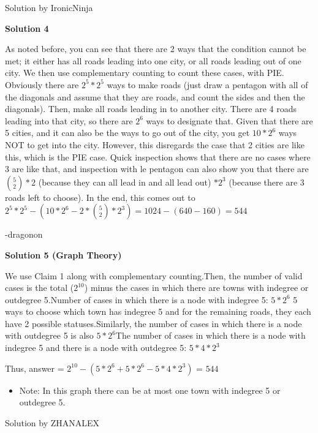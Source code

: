 \begin{enumerate}
 Solution by IronicNinja~

 



\textbf{Solution 4}

As noted before, you can see that there are 2 ways that the condition cannot be met; it either has all roads leading into one city, or all roads leading out of one city. We then use complementary counting to count these cases, with PIE. Obviously there are $2^5*2^5$ ways to make roads (just draw a pentagon with all of the diagonals and assume that they are roads, and count the sides and then the diagonals). Then, make all roads leading in to another city. There are 4 roads leading into that city, so there are $2^6$ ways to designate that. Given that there are 5 cities, and it can also be the ways to go out of the city, you get $10*2^6$ ways NOT to get into the city. However, this disregards the case that 2 cities are like this, which is the PIE case. Quick inspection shows that there are no cases where 3 are like that, and inspection with le pentagon can also show you that there are $\binom{5}{2}*2$ (because they can all lead in and all lead out) $*2^3$ (because there are 3 roads left to choose). In the end, this comes out to $2^5*2^5-(10*2^6-2*\binom{5}{2}*2^3)=1024-(640-160)=\boxed{544}$

 -dragonon

 



\textbf{Solution 5 (Graph Theory)}

We use Claim 1 along with complementary counting.Then, the number of valid cases is the total ($2^{10}$) minus the cases in which there are towns with indegree or outdegree 5.Number of cases in which there is a node with indegree 5: $5*2^6$ 5 ways to choose which town has indegree 5 and for the remaining roads, they each have 2 possible statuses.Similarly, the number of cases in which there is a node with outdegree 5 is also $5*2^6$The number of cases in which there is a node with indegree 5 and there is a node with outdegree 5: $5*4*2^3$

 Thus, answer = $2^{10}-(5*2^6+5*2^6-5*4*2^3)$ = $544$

            \begin{itemize}
        \item Note: In this graph there can be at most one town with indegree 5 or outdegree 5.
            \end{itemize}
            Solution by ZHANALEX


\end{enumerate}
